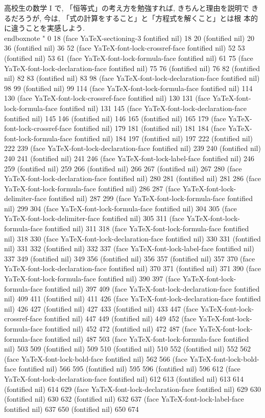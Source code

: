  高校生の数学 I で, 「恒等式」の考え方を勉強すれば, きちんと理由を説明で
 きるだろうが, 今は, 「式の計算をすること」と「方程式を解くこと」とは根
 本的に違うことを実感しよう. 
\\end{boxnote}
" 0 18 (face YaTeX-sectioning-3 fontified nil) 18 20 (fontified nil) 20 36 (fontified nil) 36 52 (face YaTeX-font-lock-crossref-face fontified nil) 52 53 (fontified nil) 53 61 (face YaTeX-font-lock-formula-face fontified nil) 61 75 (face YaTeX-font-lock-declaration-face fontified nil) 75 76 (fontified nil) 76 82 (fontified nil) 82 83 (fontified nil) 83 98 (face YaTeX-font-lock-declaration-face fontified nil) 98 99 (fontified nil) 99 114 (face YaTeX-font-lock-formula-face fontified nil) 114 130 (face YaTeX-font-lock-crossref-face fontified nil) 130 131 (face YaTeX-font-lock-formula-face fontified nil) 131 145 (face YaTeX-font-lock-declaration-face fontified nil) 145 146 (fontified nil) 146 165 (fontified nil) 165 179 (face YaTeX-font-lock-crossref-face fontified nil) 179 181 (fontified nil) 181 184 (face YaTeX-font-lock-formula-face fontified nil) 184 197 (fontified nil) 197 222 (fontified nil) 222 239 (face YaTeX-font-lock-declaration-face fontified nil) 239 240 (fontified nil) 240 241 (fontified nil) 241 246 (face YaTeX-font-lock-label-face fontified nil) 246 259 (fontified nil) 259 266 (fontified nil) 266 267 (fontified nil) 267 280 (face YaTeX-font-lock-declaration-face fontified nil) 280 281 (fontified nil) 281 286 (face YaTeX-font-lock-formula-face fontified nil) 286 287 (face YaTeX-font-lock-delimiter-face fontified nil) 287 299 (face YaTeX-font-lock-formula-face fontified nil) 299 304 (face YaTeX-font-lock-formula-face fontified nil) 304 305 (face YaTeX-font-lock-delimiter-face fontified nil) 305 311 (face YaTeX-font-lock-formula-face fontified nil) 311 318 (face YaTeX-font-lock-formula-face fontified nil) 318 330 (face YaTeX-font-lock-declaration-face fontified nil) 330 331 (fontified nil) 331 332 (fontified nil) 332 337 (face YaTeX-font-lock-label-face fontified nil) 337 349 (fontified nil) 349 356 (fontified nil) 356 357 (fontified nil) 357 370 (face YaTeX-font-lock-declaration-face fontified nil) 370 371 (fontified nil) 371 390 (face YaTeX-font-lock-formula-face fontified nil) 390 397 (face YaTeX-font-lock-formula-face fontified nil) 397 409 (face YaTeX-font-lock-declaration-face fontified nil) 409 411 (fontified nil) 411 426 (face YaTeX-font-lock-declaration-face fontified nil) 426 427 (fontified nil) 427 433 (fontified nil) 433 447 (face YaTeX-font-lock-crossref-face fontified nil) 447 449 (fontified nil) 449 452 (face YaTeX-font-lock-formula-face fontified nil) 452 472 (fontified nil) 472 487 (face YaTeX-font-lock-formula-face fontified nil) 487 503 (face YaTeX-font-lock-formula-face fontified nil) 503 509 (fontified nil) 509 510 (fontified nil) 510 552 (fontified nil) 552 562 (face YaTeX-font-lock-bold-face fontified nil) 562 566 (face YaTeX-font-lock-bold-face fontified nil) 566 595 (fontified nil) 595 596 (fontified nil) 596 612 (face YaTeX-font-lock-declaration-face fontified nil) 612 613 (fontified nil) 613 614 (fontified nil) 614 629 (face YaTeX-font-lock-declaration-face fontified nil) 629 630 (fontified nil) 630 632 (fontified nil) 632 637 (face YaTeX-font-lock-label-face fontified nil) 637 650 (fontified nil) 650 674 